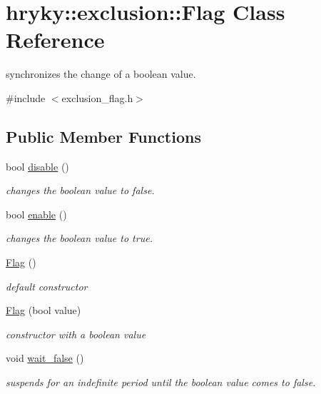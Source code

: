 \hypertarget{classhryky_1_1exclusion_1_1_flag}{\section{hryky\-:\-:exclusion\-:\-:Flag Class Reference}
\label{classhryky_1_1exclusion_1_1_flag}
}


synchronizes the change of a boolean value.  




{\ttfamily \#include $<$exclusion\-\_\-flag.\-h$>$}

\subsection*{Public Member Functions}
\begin{DoxyCompactItemize}
\item 
bool \hyperlink{classhryky_1_1exclusion_1_1_flag_a4ae4fa875b550b52110cf8a4c7f17ba3}{disable} ()
\begin{DoxyCompactList}\small\item\em changes the boolean value to false. \end{DoxyCompactList}\item 
bool \hyperlink{classhryky_1_1exclusion_1_1_flag_abe4af02d81a4ad094d20a125f2df6729}{enable} ()
\begin{DoxyCompactList}\small\item\em changes the boolean value to true. \end{DoxyCompactList}\item 
\hyperlink{classhryky_1_1exclusion_1_1_flag_a120d138be1d3f8d67ee976415f84de48}{Flag} ()
\begin{DoxyCompactList}\small\item\em default constructor \end{DoxyCompactList}\item 
\hyperlink{classhryky_1_1exclusion_1_1_flag_a3ac22a61223381dc74b43a30bcf13e69}{Flag} (bool value)
\begin{DoxyCompactList}\small\item\em constructor with a boolean value \end{DoxyCompactList}\item 
void \hyperlink{classhryky_1_1exclusion_1_1_flag_a91a07b6bb4c9ed4a83773a7c12438af4}{wait\-\_\-false} ()
\begin{DoxyCompactList}\small\item\em suspends for an indefinite period until the boolean value comes to false. \end{DoxyCompactList}\item 

\end{DoxyCompactItemize}
